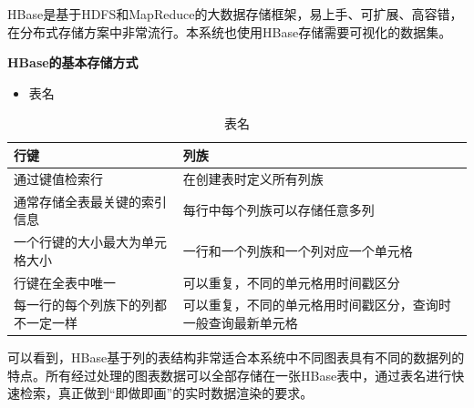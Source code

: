 HBase是基于HDFS和MapReduce的大数据存储框架，易上手、可扩展、高容错，在分布式存储方案中非常流行。本系统也使用HBase存储需要可视化的数据集。

\newpage
\textbf{HBase的基本存储方式}
\begin{itemize}
\item 表名
\end{itemize}

\begin{table}[!htbp]
	\centering
	\caption{表名}
	\label{tab:my-table}
	\begin{tabular}{|p{3cm}|p{10cm}|}
		\hline
		\rowcolor[HTML]{DAE8FC} 
		行键 & 列族 \\ \hline
		通过键值检索行 & 在创建表时定义所有列族  \\ \hline
		通常存储全表最关键的索引信息 & 每行中每个列族可以存储任意多列 \\ \hline
		一个行键的大小最大为单元格大小 & 一行和一个列族和一个列对应一个单元格 \\ \hline
        行键在全表中唯一 & 可以重复，不同的单元格用时间戳区分 \\ \hline
        每一行的每个列族下的列都不一定一样 & 可以重复，不同的单元格用时间戳区分，查询时一般查询最新单元格 \\ \hline
	\end{tabular}
\end{table}

可以看到，HBase基于列的表结构非常适合本系统中不同图表具有不同的数据列的特点。所有经过处理的图表数据可以全部存储在一张HBase表中，通过表名进行快速检索，真正做到“即做即画”的实时数据渲染的要求。

